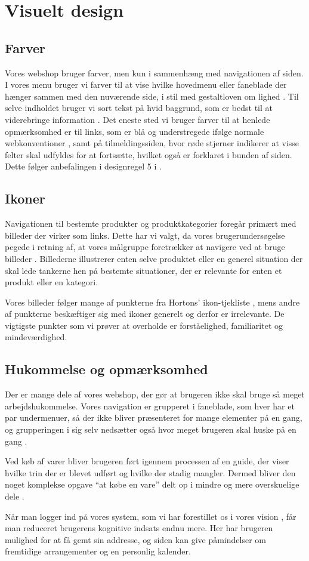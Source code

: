 \chapter{Visuelt design}

\section{Farver}
Vores webshop bruger farver, men kun i sammenhæng med navigationen af siden. I vores menu bruger vi farver til at vise hvilke hovedmenu eller faneblade
der hænger sammen med den nuværende side, i stil med gestaltloven om lighed \cite[s. 336]{Benyon2010}. Til selve indholdet bruger vi sort tekst
på hvid baggrund, som er bedst til at viderebringe information \cite[s. 430]{marcus}. Det eneste sted vi bruger farver til at henlede opmærksomhed er
til links, som er blå og understregede ifølge normale webkonventioner \cite[s. 385]{Benyon2010}, samt på tilmeldingssiden, hvor røde stjerner indikerer at visse felter skal udfyldes for at fortsætte, hvilket også er forklaret i bunden af siden. Dette følger anbefalingen i designregel 5 i \cite[s. 344]{Benyon2010}.

\section{Ikoner}
Navigationen til bestemte produkter og produktkategorier foregår primært med billeder der virker som links. Dette har vi valgt, da vores brugerundersøgelse
pegede i retning af, at vores målgruppe foretrækker at navigere ved at bruge billeder \cite{os}. Billederne illustrerer enten selve produktet eller en generel situation
der skal lede tankerne hen på bestemte situationer, der er relevante for enten et produkt eller en kategori. 

Vores billeder følger mange af punkterne fra Hortons' ikon-tjekliste \cite[s. 327]{Benyon2010}, mens andre af punkterne beskæftiger sig med ikoner generelt
og derfor er irrelevante. De vigtigste punkter som vi prøver at overholde er forståelighed, familiaritet og mindeværdighed. 

\section{Hukommelse og opmærksomhed}
Der er mange dele af vores webshop, der gør at brugeren ikke skal bruge så meget arbejdshukommelse. Vores navigation er grupperet i faneblade, som hver har et par
undermenuer, så der ikke bliver præsenteret for mange elementer på en gang, og grupperingen i sig selv nedsætter også hvor meget brugeren skal huske på en gang
\cite[s. 339]{Benyon2010}.

Ved køb af varer bliver brugeren ført igennem processen af en guide, der viser hvilke trin der er blevet udført og hvilke der stadig mangler. Dermed bliver den noget komplekse opgave ``at købe en vare'' delt op i mindre og mere overskuelige dele \cite[s. 333]{Beynon2010}.

Når man logger ind på vores system, som vi har forestillet os i vores vision \cite{osos}, får man reduceret brugerens kognitive indsats endnu mere. Her har brugeren mulighed for at få gemt sin addresse, og siden kan give påmindelser om fremtidige arrangementer og en personlig kalender.
